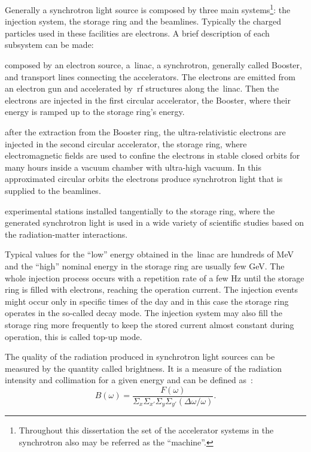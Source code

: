 Generally a synchrotron light source is composed by three main systems\footnote{Throughout this dissertation the set of the accelerator systems in the synchrotron also may be referred as the ``machine''.}: the injection system, the storage ring and the beamlines. Typically the charged particles used in these facilities are electrons. A brief description of each subsystem can be made:
\begin{description}[align=left]
    \item[Injection system:] composed by an electron source, a~\gls{linac}, a synchrotron, generally called Booster, and transport lines connecting the accelerators. The electrons are emitted from an electron gun and accelerated by~\gls{rf} structures along the~\gls{linac}. Then the electrons are injected in the first circular accelerator, the Booster, where their energy is ramped up to the storage ring's energy.
    \item[Storage ring:] after the extraction from the Booster ring, the ultra-relativistic electrons are injected in the second circular accelerator, the storage ring, where electromagnetic fields are used to confine the electrons in stable closed orbits for many hours inside a vacuum chamber with ultra-high vacuum. In this approximated circular orbits the electrons produce synchrotron light that is supplied to the beamlines.
    \item[Beamlines:] experimental stations installed tangentially to the storage ring, where the generated synchrotron light is used in a wide variety of scientific studies based on the radiation-matter interactions.
\end{description}

Typical values for the ``low'' energy obtained in the~\gls{linac} are hundreds of \si{\mega\electronvolt} and the ``high'' nominal energy in the storage ring are usually few \si{\giga\electronvolt}. The whole injection process occurs with a repetition rate of a few \si{\hertz} until the storage ring is filled with electrons, reaching the operation current. The injection events might occur only in specific times of the day and in this case the storage ring operates in the so-called decay mode. The injection system may also fill the storage ring more frequently to keep the stored current almost constant during operation, this is called top-up mode.

The quality of the radiation produced in synchrotron light sources can be measured by the quantity called brightness. It is a measure of the radiation intensity and collimation for a given energy and can be defined as~\cite{huang2013}:
\begin{equation}
    B(\omega) = \dfrac{F(\omega)}{\Sigma_x \Sigma_{x'} \Sigma_y \Sigma_{y'} \left(\Delta \omega /\omega\right)}.
\end{equation}

